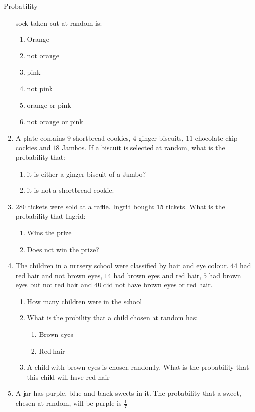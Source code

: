 \begin{eocexercises}{Probability}
\begin{enumerate}[itemsep=5pt, label=\textbf{\arabic*}. ]
    sock taken out at random is:
    \begin{enumerate}
    \item Orange
    \item not orange
    \item pink
    \item not pink
    \item orange or pink
    \item not orange or pink
    \end{enumerate}
  \item A plate contains $9$ shortbread cookies, $4$ ginger biscuits,
    $11$ chocolate chip cookies and $18$ Jambos. If a biscuit is
    selected at random, what is the probability that:
    \begin{enumerate}
    \item it is either a ginger biscuit of a Jambo?
    \item it is not a shortbread cookie.
    \end{enumerate}
  \item $280$ tickets were sold at a raffle. Ingrid bought $15$
    tickets. What is the probability that Ingrid:
    \begin{enumerate}
    \item Wins the prize
    \item Does not win the prize?
    \end{enumerate}
  \item The children in a nursery school were classified by hair and
    eye colour. $44$ had red hair and not brown eyes, $14$ had brown eyes
    and red hair, $5$ had brown eyes but not red hair and $40$ did not
    have brown eyes or red hair.
    \begin{enumerate}
    \item How many children were in the school
    \item What is the probility that a child chosen at random has:
      \begin{enumerate}
      \item Brown eyes
      \item Red hair
      \end{enumerate} 
    \item A child with brown eyes is chosen randomly. What is the
      probability that this child will have red hair
    \end{enumerate}
  \item A jar has purple, blue and black sweets in it. The probability
    that a sweet, chosen at random, will be purple is $\frac{1}{7}$

\end{enumerate}
\end{eocexercises}
